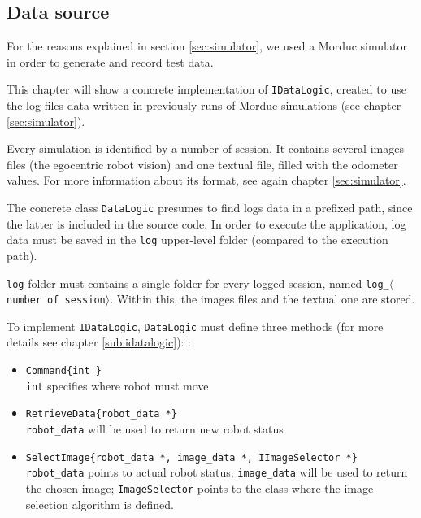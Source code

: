 \subsection{Data source}
\label{sub:datasource}
For the reasons explained in section \ref{sec:simulator}, 
we used a Morduc simulator in order to generate and record 
test data.



This chapter will show a concrete implementation of 
\texttt{IDataLogic}, created to use the log files data written
in previously runs of Morduc simulations (see chapter \ref{sec:simulator}).


%

%
Every simulation is identified by a number of session. It contains several
images files (the egocentric robot vision) and one textual file, filled with the
odometer values. For more information about its format, see again chapter
\ref{sec:simulator}.
%

%
The concrete class \texttt{DataLogic} presumes to find logs data in a prefixed
path, since the latter is included in the source code. In order to execute the
application, log data must be saved in the \texttt{log} upper-level folder (compared
to the execution path).
%

%
\texttt{log} folder must contains a single folder for every logged session, named
\texttt{log\_$\langle$number of session$\rangle$}. Within this, the images files and the
textual one are stored.
%

%
To implement \texttt{IDataLogic}, \texttt{DataLogic} must define three methods (for more
details see chapter \ref{sub:idatalogic}):
:
%
\begin{itemize}

  \item \texttt{Command\{int \}} \\
    \texttt{int} specifies where robot must move 

  \item \texttt{RetrieveData\{robot\_data *\}} \\
    \texttt{robot\_data} will be used to return new robot status

  \item \texttt{SelectImage\{robot\_data *, image\_data *, IImageSelector *\}} \\
    \texttt{robot\_data} points to actual robot status; \texttt{image\_data} will be used
    to return the chosen image; \texttt{ImageSelector} points to the class where the image
    selection algorithm is defined.


\end{itemize}
%

